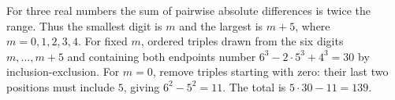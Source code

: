 For three real numbers the sum of pairwise absolute differences is twice the range. Thus the smallest digit is $m$ and the largest is $m+5$, where $m=0,1,2,3,4$. For fixed $m$, ordered triples drawn from the six digits $m,\ldots,m+5$ and containing both endpoints number $6^3-2\cdot5^3+4^3=30$ by inclusion-exclusion. For $m=0$, remove triples starting with zero: their last two positions must include $5$, giving $6^2-5^2=11$. The total is $\boxed{5\cdot30-11=139}$.
